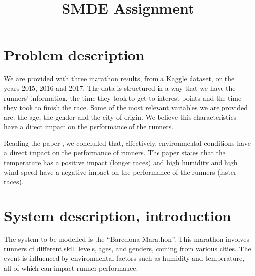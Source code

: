 \documentclass[conference]{IEEEtran}
\begin{document}
\title{SMDE Assignment}

\author{
\and
{}
\and
{}
}

\maketitle

\section{Problem description}
We are provided with three marathon results, from a Kaggle dataset, on the years 2015, 2016 and 2017. The data is structured in a way that we have the runners' information, the time they took to get to interest points and the time they took to finish the race. Some of the most relevant variables we are provided are: the age, the gender and the city of origin. We believe this characteristics have a direct impact on the performance of the runners.

Reading the paper \cite{b8}, we concluded that, effectively, environmental conditions have a direct impact on the performance of runners. The paper states that the temperature has a positive impact (longer races) and high humidity and high wind speed have a negative impact on the performance of the runners (faster races).

% 
\section{System description, introduction}
The system to be modelled is the ``Barcelona Marathon''. This marathon involves runners of different skill levels, ages, and genders, coming from various cities. The event is influenced by environmental factors such as humidity and temperature, all of which can impact runner performance. 
\end{document}
